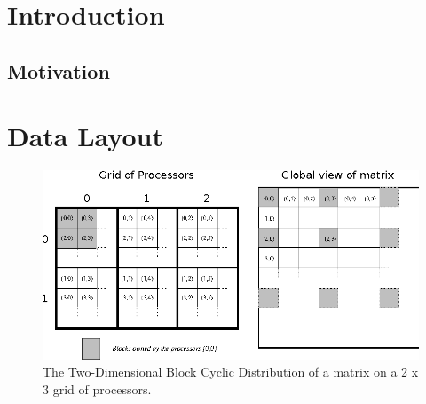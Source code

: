 \documentclass[conference]{IEEEtran}
\begin{document}
\title{}

\author{
\and
{}
}

\maketitle

\begin{abstract}

\end{abstract}

\IEEEpeerreviewmaketitle

\section{Introduction}

\subsection{Motivation}

\section{Data Layout}
\begin{figure}
 \centering
 \includegraphics[width=\linewidth]{gfx/datalayout}
 \caption{The Two-Dimensional Block Cyclic Distribution of a matrix on a 2 x 3 grid of processors.}
 \label{fig:datalayout}
\end{figure}
\end{document}
